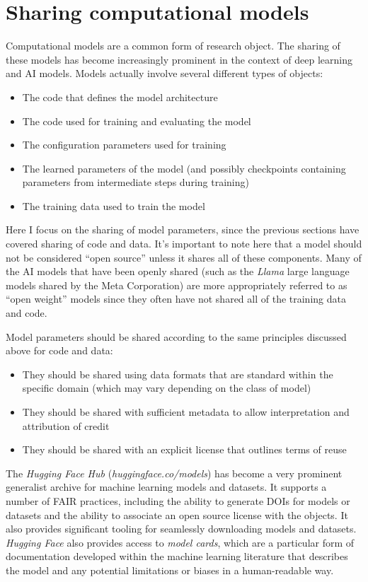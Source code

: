 \section{Sharing computational models}

Computational models are a common form of research object. The sharing of these models has become increasingly prominent in the context of deep learning and AI models.  Models actually involve several different types of objects:

\begin{itemize}
\item The code that defines the model architecture
\item The code used for training and evaluating the model
\item The configuration parameters used for training
\item The learned parameters of the model (and possibly checkpoints containing parameters from intermediate steps during training)
\item The training data used to train the model
\end{itemize}

Here I focus on the sharing of model parameters, since the previous sections have covered sharing of code and data.  It's important to note here that a model should not be considered ``open source'' unless it shares all of these components.  Many of the AI models that have been openly shared (such as the \textit{Llama} large language models shared by the Meta Corporation) are more appropriately referred to as ``open weight'' models since they often have not shared all of the training data and code.

Model parameters should be shared according to the same principles discussed above for code and data:

\begin{itemize}
\item They should be shared using data formats that are standard within the specific domain (which may vary depending on the class of model)
\item They should be shared with sufficient metadata to allow interpretation and attribution of credit
\item They should be shared with an explicit license that outlines terms of reuse
\end{itemize}

The \textit{Hugging Face Hub} (\textit{huggingface.co/models}) has become a very prominent generalist archive for machine learning models and datasets.  It supports a number of FAIR practices, including the ability to generate DOIs for models or datasets and the ability to associate an open source license with the objects.  It also provides significant tooling for seamlessly downloading models and datasets. \textit{Hugging Face} also provides access to \textit{model cards}, which are a particular form of documentation developed within the machine learning literature \citep{Mitchell:2019aa} that describes the model and any potential limitations or biases in a human-readable way.

